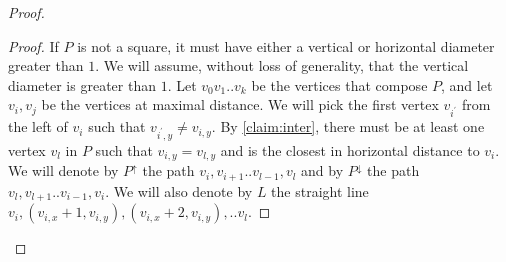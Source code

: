 \begin{proof}
  \begin{proof} 
%
If $P$ is not a square, it must have either a vertical or horizontal diameter greater than $1$. We will assume, without loss of generality, that the vertical diameter is greater than $1$. Let $v_{0}v_{1}..v_{k}$ be the vertices that compose $P$, and let $v_{i},v_{j}$ be the vertices at maximal distance. We will pick the first vertex $v_{i^\prime}$ from the left of $v_{i}$ such that $v_{i^\prime , y} \neq v_{i,y}$. By \cref{claim:inter}, there must be at least one vertex $v_{l}$ in $P$ such that $v_{i,y} = v_{l,y}$ and is the closest in horizontal distance to $v_{i}$. We will denote by $P^{\uparrow}$ the path $v_{i},v_{i+1}..v_{l-1},v_{l}$ and by $P^{\downarrow}$ the path $v_{l},v_{l+1}..v_{i-1},v_{i}$. We will also denote by $L$ the straight line $v_{i},\left( v_{i,x}+1, v_{i,y} \right), \left( v_{i,x}+2, v_{i,y} \right), .. v_{l}$. 


\end{proof}
\end{proof}
